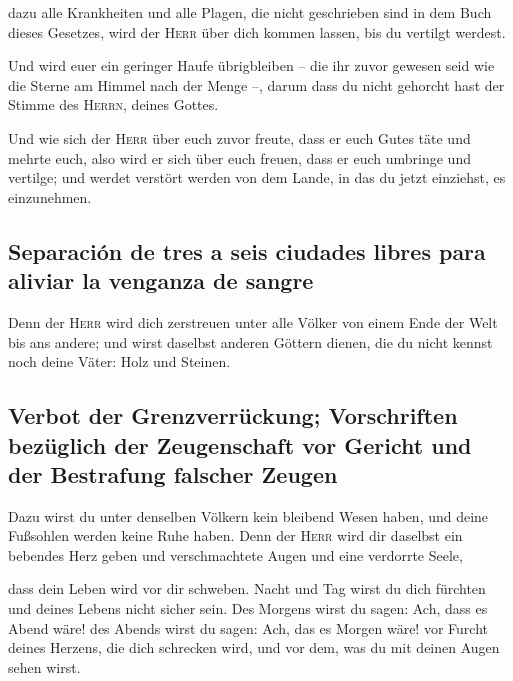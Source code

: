  dazu alle Krankheiten und alle Plagen, die nicht
geschrieben sind in dem Buch dieses Gesetzes, wird der \textsc{Herr}
über dich kommen lassen, bis du vertilgt werdest.

 Und wird euer ein geringer Haufe übrigbleiben -- die ihr
zuvor gewesen seid wie die Sterne am Himmel nach der Menge --, darum
dass du nicht gehorcht hast der Stimme des \textsc{Herrn}, deines
Gottes.

 Und wie sich der \textsc{Herr} über euch zuvor freute,
dass er euch Gutes täte und mehrte euch, also wird er sich über euch
freuen, dass er euch umbringe und vertilge; und werdet verstört werden
von dem Lande, in das du jetzt einziehst, es einzunehmen.

\hypertarget{separaciuxf3n-de-tres-a-seis-ciudades-libres-para-aliviar-la-venganza-de-sangre}{%
\subsection{Separación de tres a seis ciudades libres para aliviar la
venganza de
sangre}\label{separaciuxf3n-de-tres-a-seis-ciudades-libres-para-aliviar-la-venganza-de-sangre}}

 Denn der \textsc{Herr} wird dich zerstreuen unter alle
Völker von einem Ende der Welt bis ans andere; und wirst daselbst
anderen Göttern dienen, die du nicht kennst noch deine Väter: Holz und
Steinen.

\hypertarget{verbot-der-grenzverruxfcckung-vorschriften-bezuxfcglich-der-zeugenschaft-vor-gericht-und-der-bestrafung-falscher-zeugen}{%
\subsection{Verbot der Grenzverrückung; Vorschriften bezüglich der
Zeugenschaft vor Gericht und der Bestrafung falscher
Zeugen}\label{verbot-der-grenzverruxfcckung-vorschriften-bezuxfcglich-der-zeugenschaft-vor-gericht-und-der-bestrafung-falscher-zeugen}}

 Dazu wirst du unter denselben Völkern kein bleibend
Wesen haben, und deine Fußsohlen werden keine Ruhe haben. Denn der
\textsc{Herr} wird dir daselbst ein bebendes Herz geben und
verschmachtete Augen und eine verdorrte Seele,

 dass dein Leben wird vor dir schweben. Nacht und Tag
wirst du dich fürchten und deines Lebens nicht sicher sein.
 Des Morgens wirst du sagen: Ach, dass es Abend wäre! des
Abends wirst du sagen: Ach, das es Morgen wäre! vor Furcht deines
Herzens, die dich schrecken wird, und vor dem, was du mit deinen Augen
sehen wirst.

